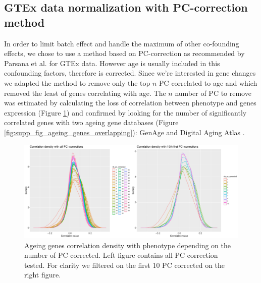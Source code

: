 

\subsection{GTEx data normalization with PC-correction method}
\label{supp:supp_pc_correction}

In order to limit batch effect and handle the maximum of other co-founding effects, we chose to use a method based on PC-correction as recommended by Parsana et al. \cite{Parsana2019} for GTEx data. However age is usually included in this confounding factors, therefore is corrected. Since we're interested in gene changes we adapted the method to remove only the top $n$ PC correlated to age and which removed the least of genes correlating with age. The $n$ number of PC to remove was estimated by calculating the loss of correlation between phenotype and genes expression (Figure \ref{fig:supp_fig_ageing_correlation_density}) and confirmed by looking for the number of significantly correlated genes with two ageing gene databases (Figure \ref{fig:supp_fig_ageing_genes_overlapping}): GenAge \cite{Tacutu2018} and Digital Aging Atlas \cite{Craig2015}.

\begin{figure}[ht]
    \includegraphics[width=\textwidth, center]{img/annexe_add_file_GWENA/additional_file_figure_2.pdf}
    \caption{Ageing genes correlation density with phenotype depending on the number of PC corrected. Left figure contains all PC correction tested. For clarity we filtered on the first 10 PC corrected on the right figure.}
    \label{fig:supp_fig_ageing_correlation_density}
\end{figure}

